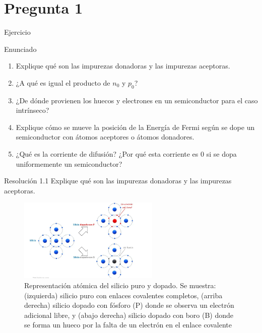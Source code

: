 \documentclass[
    10pt,
    aspectratio=169,
    xcolor={dvipsnames},
    spanish,
    ]{beamer}
\begin{document}
\section{Pregunta 1}
\begin{frame}{Ejercicio}
\begin{block}{Enunciado}
\begin{enumerate}
    \item Explique qué son las impurezas donadoras y las impurezas aceptoras.
    \item ¿A qué es igual el producto de $n_0$ y $p_0$?
    \item ¿De dónde provienen los huecos y electrones en un semiconductor para el caso intrínseco?
    \item Explique cómo se mueve la posición de la Energía de Fermi según se dope un semiconductor con átomos aceptores o átomos donadores.
    \item ¿Qué es la corriente de difusión? ¿Por qué esta corriente es $0$ si se dopa uniformemente un semiconductor?
\end{enumerate}
\end{block}
\end{frame}
\begin{frame}
  \begin{block}{Resolución 1.1}
    Explique qué son las impurezas donadoras y las impurezas aceptoras.
  \end{block}
  \begin{figure}
    \centering
    \includegraphics[width=0.6\textwidth]{../figures/Auxiliar_2_3.png}
    \caption{Representación atómica del silicio puro y dopado. Se muestra: (izquierda) silicio puro con enlaces covalentes completos, (arriba derecha) silicio dopado con fósforo (P) donde se observa un electrón adicional libre, y (abajo derecha) silicio dopado con boro (B) donde se forma un hueco por la falta de un electrón en el enlace covalente}
  \end{figure}
\end{frame}
\end{document}
